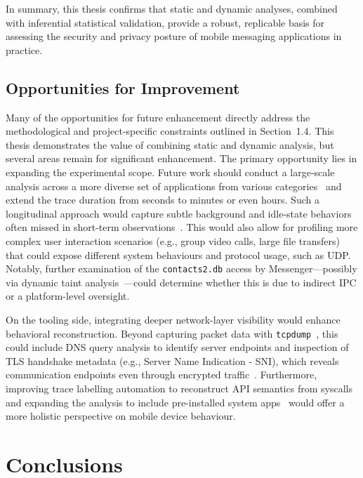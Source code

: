 \documentclass[a4paper,12pt]{report}
\begin{document}
In summary, this thesis confirms that static and dynamic analyses, combined with inferential statistical validation, provide a robust, replicable basis for assessing the security and privacy posture of mobile messaging applications in practice.

\section{Opportunities for Improvement}

Many of the opportunities for future enhancement directly address the methodological and project-specific constraints outlined in Section~1.4. This thesis demonstrates the value of combining static and dynamic analysis, but several areas remain for significant enhancement. The primary opportunity lies in expanding the experimental scope. Future work should conduct a large-scale analysis across a more diverse set of applications from various categories~\cite{lindorfer2014andrubis} and extend the trace duration from seconds to minutes or even hours. Such a longitudinal approach would capture subtle background and idle-state behaviors often missed in short-term observations~\cite{Razaghpanah2020AppsTrackers}. This would also allow for profiling more complex user interaction scenarios (e.g., group video calls, large file transfers) that could expose different system behaviours and protocol usage, such as UDP. Notably, further examination of the \texttt{contacts2.db} access by Messenger—possibly via dynamic taint analysis~\cite{enck2014taintdroid}—could determine whether this is due to indirect IPC or a platform-level oversight.

On the tooling side, integrating deeper network-layer visibility would enhance behavioral reconstruction. Beyond capturing packet data with \texttt{tcpdump}~\cite{lindorfer2014andrubis}, this could include DNS query analysis to identify server endpoints and inspection of TLS handshake metadata (e.g., Server Name Indication - SNI), which reveals communication endpoints even through encrypted traffic~\cite{apthorpe2018smart}. Furthermore, improving trace labelling automation to reconstruct API semantics from syscalls~\cite{nisi2019syscall} and expanding the analysis to include pre-installed system apps~\cite{Tian2020Preinstalled} would offer a more holistic perspective on mobile device behaviour.


\chapter{Conclusions}
\end{document}
